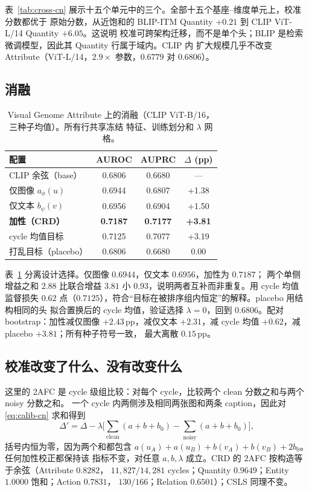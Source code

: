 \documentclass[10pt,twocolumn,a4paper]{ctexart}
\begin{document}
表~\ref{tab:cross-cn} 展示十五个单元中的三个。全部十五个基座--维度单元上，校准分数都优于
原始分数，从近饱和的 BLIP-ITM Quantity $+0.21$ 到 CLIP ViT-L/14 Quantity $+6.05$。这说明
校准可跨架构迁移，而不是单个头；BLIP 是检索微调模型，因此其 Quantity 行属于域内。CLIP 内
扩大规模几乎不改变 Attribute（ViT-L/14，$2.9\times$ 参数，$0.6779$ 对 $0.6806$）。

\subsection{消融}
\begin{table}[t]
\centering
\small
\setlength{\tabcolsep}{5pt}
\caption{Visual Genome Attribute 上的消融（CLIP ViT-B/16，三种子均值）。所有行共享冻结
特征、训练划分和 $\lambda$ 网格。}
\label{tab:ablation-cn}
\begin{tabular}{lccc}
\toprule
配置 & AUROC & AUPRC & $\Delta$ (pp) \\
\midrule
CLIP 余弦（base）       & 0.6806 & 0.6680 & ---    \\
仅图像 $a_\phi(u)$      & 0.6944 & 0.6807 & +1.38  \\
仅文本 $b_\psi(v)$      & 0.6956 & 0.6904 & +1.50  \\
\textbf{加性（CRD）}     & \textbf{0.7187} & \textbf{0.7177} & \textbf{+3.81} \\
cycle 均值目标           & 0.7125 & 0.7077 & +3.19  \\
打乱目标（placebo）      & 0.6806 & 0.6680 & 0.00   \\
\bottomrule
\end{tabular}
\end{table}

表~\ref{tab:ablation-cn} 分离设计选择。仅图像 $0.6944$，仅文本 $0.6956$，加性为 $0.7187$；
两个单侧增益之和 $2.88$ 比联合增益 $3.81$ 小 $0.93$，说明两者互补而非重复。用 cycle 均值
监督损失 $0.62$ 点（$0.7125$），符合“目标在被排序组内恒定”的解释。placebo 用结构相同的头
拟合置换后的 cycle 均值，验证选择 $\lambda=0$，回到 $0.6806$。配对 bootstrap：加性减仅图像
$+2.43$\,pp，减仅文本 $+2.31$，减 cycle 均值 $+0.62$，减 placebo $+3.81$；所有种子符号一致，
最大离散 $0.15$\,pp。

\subsection{校准改变了什么、没有改变什么}
这里的 2AFC 是 cycle 级组比较：对每个 cycle，比较两个 clean 分数之和与两个 noisy 分数之和。
一个 cycle 内两侧涉及相同两张图和两条 caption，因此对 \eqref{eq:calib-cn} 求和得到
\begin{equation}
  \Delta'=\Delta-\lambda\Big[\sum_{\text{clean}}(a+b+b_0)
  -\sum_{\text{noisy}}(a+b+b_0)\Big],
\end{equation}
括号内恒为零，因为两个和都包含 $a(u_A)+a(u_B)+b(v_A)+b(v_B)+2b_0$。任何加性校正都保持该
指标不变，对任意 $a,b,\lambda$ 成立。CRD 的 2AFC 按构造等于余弦（Attribute $0.8282$，
$11{,}827/14{,}281$ cycles；Quantity $0.9649$；Entity $1.0000$ 饱和；Action $0.7831$，
$130/166$；Relation $0.6501$）；CSLS 同理不变。
\end{document}
